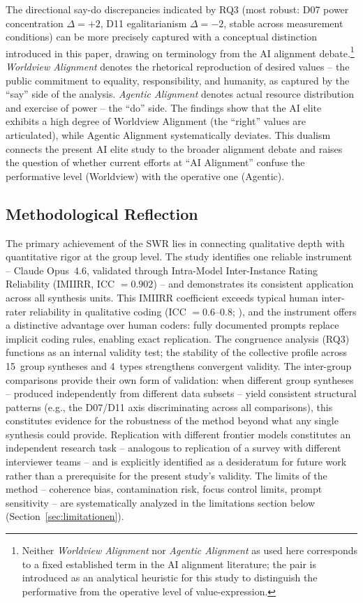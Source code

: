 \documentclass[12pt,a4paper]{article}
\begin{document}
The directional say-do discrepancies indicated by RQ3 (most robust: D07 power concentration $\Delta = +2$, D11 egalitarianism $\Delta = -2$, stable across measurement conditions) can be more precisely captured with a conceptual distinction introduced in this paper, drawing on terminology from the AI alignment debate.\footnote{Neither \emph{Worldview Alignment} nor \emph{Agentic Alignment} as used here corresponds to a fixed established term in the AI alignment literature; the pair is introduced as an analytical heuristic for this study to distinguish the performative from the operative level of value-expression.} \emph{Worldview Alignment} denotes the rhetorical reproduction of desired values -- the public commitment to equality, responsibility, and humanity, as captured by the ``say'' side of the analysis. \emph{Agentic Alignment} denotes actual resource distribution and exercise of power -- the ``do'' side. The findings show that the AI elite exhibits a high degree of Worldview Alignment (the ``right'' values are articulated), while Agentic Alignment systematically deviates. This dualism connects the present AI elite study to the broader alignment debate and raises the question of whether current efforts at ``AI Alignment'' confuse the performative level (Worldview) with the operative one (Agentic).


\subsection{Methodological Reflection}
\label{sec:diskussion:methodik}

The primary achievement of the SWR lies in connecting qualitative depth with quantitative rigor at the group level. The study identifies one reliable instrument -- Claude Opus~4.6, validated through Intra-Model Inter-Instance Rating Reliability (IMIIRR, ICC $= 0.902$) -- and demonstrates its consistent application across all synthesis units. This IMIIRR coefficient exceeds typical human inter-rater reliability in qualitative coding (ICC $= 0.6$--$0.8$; \citealt{Hallgren2012}), and the instrument offers a distinctive advantage over human coders: fully documented prompts replace implicit coding rules, enabling exact replication. The congruence analysis (RQ3) functions as an internal validity test; the stability of the collective profile across 15~group syntheses and 4~types strengthens convergent validity. The inter-group comparisons provide their own form of validation: when different group syntheses -- produced independently from different data subsets -- yield consistent structural patterns (e.g., the D07/D11 axis discriminating across all comparisons), this constitutes evidence for the robustness of the method beyond what any single synthesis could provide. Replication with different frontier models constitutes an independent research task -- analogous to replication of a survey with different interviewer teams -- and is explicitly identified as a desideratum for future work rather than a prerequisite for the present study's validity. The limits of the method -- coherence bias, contamination risk, focus control limits, prompt sensitivity -- are systematically analyzed in the limitations section below (Section~\ref{sec:limitationen}).
\end{document}

